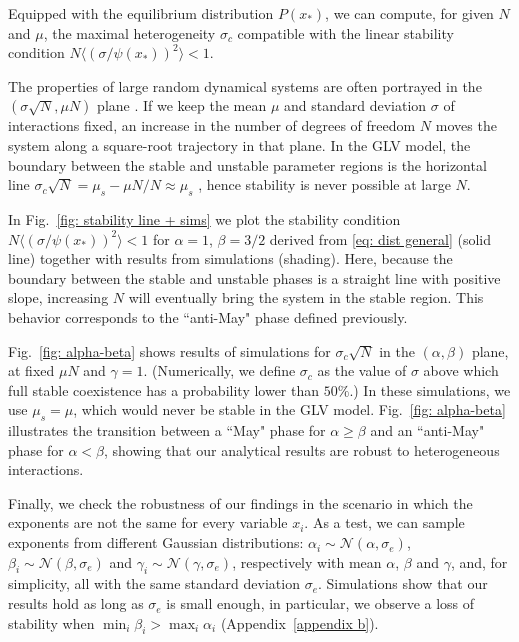 \documentclass[
 pre,
 twocolumn,
 amsmath,
 amssymb,
 aps,
]{revtex4-2}
\begin{document}
Equipped with the equilibrium distribution $P(x_*)$, we can compute, for given $N$ and $\mu$, the maximal heterogeneity $\sigma_c$ compatible with the linear stability condition $N\langle (\sigma/\psi(x_*))^2\rangle < 1$.

The properties of large random dynamical systems are often portrayed in the $(\sigma \sqrt{N},\mu N)$ plane \cite{bunin2017ecological}.
If we keep the mean $\mu$ and standard deviation $\sigma$ of interactions fixed, an increase in the number of degrees of freedom $N$ moves the system along a square-root trajectory in that plane. In the GLV model, the boundary between the stable and unstable parameter regions is the horizontal line $\sigma_c\sqrt{N} = \mu_s - \mu N / N \approx \mu_s$ \cite{bunin2017ecological}, hence stability is never possible at large $N$. 

In Fig.~\ref{fig: stability line + sims} we plot the stability condition $N\langle (\sigma/\psi(x_*))^2\rangle < 1$ for $\alpha = 1$, $\beta = 3/2$ derived from \eqref{eq: dist general} (solid line) together with results from simulations (shading). Here, because the boundary between the stable and unstable phases is a straight line with positive slope, increasing $N$ will eventually bring the system in the stable region. This behavior corresponds to the ``anti-May" phase defined previously. 

Fig.~\ref{fig: alpha-beta} shows results of simulations for $\sigma_c\sqrt{N}$ in the $(\alpha,\beta)$ plane, at fixed $\mu N$ and $\gamma = 1$. (Numerically, we define $\sigma_c$ as the value of $\sigma$ above which full stable coexistence has a probability lower than $50\%$.) In these simulations, we use $\mu_s = \mu$, which would never be stable in the GLV model. Fig.~\ref{fig: alpha-beta} illustrates the transition between a ``May" phase for $\alpha \geq \beta$ and an ``anti-May" phase for $\alpha < \beta$, showing that our analytical results are robust to heterogeneous interactions.

Finally, we check the robustness of our findings in the scenario in which the exponents are not the same for every variable $x_i$. As a test, we can sample exponents from different Gaussian distributions: $\alpha_i\sim\mathcal N(\alpha,\sigma_e)$, $\beta_i\sim\mathcal N(\beta,\sigma_e)$ and $\gamma_i\sim\mathcal N(\gamma,\sigma_e)$, respectively with mean $\alpha$, $\beta$ and $\gamma$, and, for simplicity, all with the same standard deviation $\sigma_e$. 
Simulations show that our results hold as long as $\sigma_e$ is small enough, in particular, we observe a loss of stability when $\min_i\beta_i>\max_i\alpha_i$ (Appendix~\ref{appendix b}).
\end{document}
